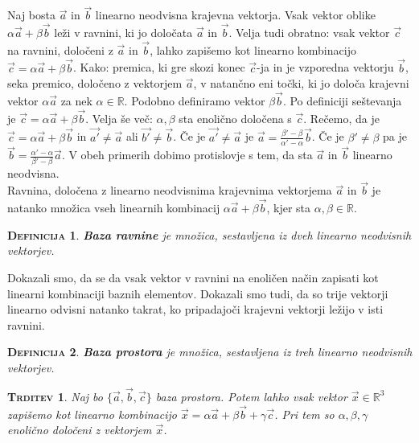 \documentclass[a4paper,12pt]{article}
\newtheorem*{trditev}{\textsc{Trditev}}
\newtheorem*{definicija}{\textsc{Definicija}}
\begin{document}
Naj bosta $\vec{a}$ in $\vec{b}$ linearno neodvisna krajevna vektorja. Vsak vektor oblike $\alpha \vec{a} + \beta \vec{b}$ leži v ravnini, ki jo določata $\vec{a}$ in $\vec{b}$. Velja tudi obratno: vsak vektor $\vec{c}$ na ravnini, določeni z $\vec{a}$ in $\vec{b}$, lahko zapišemo kot linearno kombinacijo $ \vec{c} = \alpha \vec{a} + \beta \vec{b}$. Kako: premica, ki gre skozi konec $\vec{c}$-ja in je vzporedna vektorju $\vec{b}$, seka premico, določeno z vektorjem $\vec{a}$, v natančno eni točki, ki jo določa krajevni vektor $\alpha \vec{a}$ za nek $\alpha \in \mathbb{R}$. Podobno definiramo vektor $ \beta \vec{b}$. Po definiciji seštevanja je  $ \vec{c} = \alpha \vec{a} + \beta \vec{b}$. Velja še več: $\alpha, \beta$ sta enolično določena s $\vec{c}$. Rečemo, da je  $ \vec{c} = \alpha \vec{a} + \beta \vec{b}$ in $\vec{a'} \neq \vec{a}$ ali $\vec{b'} \neq \vec{b}$. Če je $\vec{a'} \neq \vec{a}$ je $\vec{a} = \frac{\beta ' - \beta}{\alpha ' - \alpha} \vec{b}$. Če je $\beta ' \neq \beta$ pa je $\vec{b} = \frac{\alpha ' - \alpha}{\beta ' - \beta} \vec{a}$. V obeh primerih dobimo protislovje s tem, da sta $\vec{a}$ in $\vec{b}$ linearno neodvisna. \\

Ravnina, določena z linearno neodvisnima krajevnima vektorjema $\vec{a}$ in $\vec{b}$ je natanko množica vseh linearnih kombinacij $\alpha \vec{a} + \beta \vec{b}$, kjer sta $\alpha, \beta \in \mathbb{R}$. \\

\begin{definicija}
\textbf{Baza ravnine} je množica, sestavljena iz dveh linearno neodvisnih vektorjev.\\
\end{definicija}

Dokazali smo, da se da vsak vektor v ravnini na enoličen način zapisati kot linearni kombinaciji baznih elementov. Dokazali smo tudi, da so trije vektorji linearno odvisni natanko takrat, ko pripadajoči krajevni vektorji ležijo v isti ravnini. \\

\begin{definicija}
\textbf{Baza prostora} je množica, sestavljena iz treh linearno neodvisnih vektorjev.\\
\end{definicija}

\begin{trditev}
Naj bo $\{\vec{a},\vec{b},\vec{c}\}$ baza prostora. Potem lahko vsak vektor $\vec{x} \in \mathbb{R}^3$ zapišemo kot linearno kombinacijo $\vec{x} = \alpha \vec{a} + \beta \vec{b} + \gamma \vec{c}$. Pri tem so $\alpha, \beta, \gamma$ enolično določeni z vektorjem $\vec{x}$.\\
\end{trditev}
\end{document}
